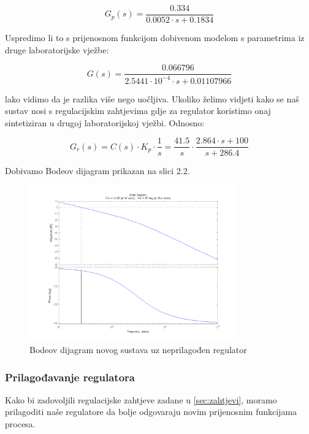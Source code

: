 \documentclass[12pt,a4paper]{article}
\begin{document}
\begin{equation}
G_p(s)=\frac{0.334}{0.0052\cdot s + 0.1834}
\end{equation}

\newpage

Uspredimo li to s prijenosnom funkcijom dobivenom modelom s parametrima iz druge laboratorijske vježbe:

\begin{equation}
G(s)=\frac{0.066796}{2.5441\cdot10^{-4}\cdot s + 0.01107966}
\end{equation}

lako vidimo da je razlika više nego uočljiva.
\newline
Ukoliko želimo vidjeti kako se naš sustav nosi s regulacijskim zahtjevima gdje za regulator koristimo onaj sintetiziran u drugoj laboratorijskoj vježbi. Odnosno:

\begin{equation}
G_r(s)=C(s)\cdot K_p \cdot \frac{1}{s} = \frac{41.5}{s} \cdot \frac{2.864\cdot s+100}{s+286.4}
\end{equation}

Dobivamo Bodeov dijagram prikazan na slici 2.2.

\begin{figure}[h]
	\begin{center}
	\includegraphics[width=0.8\textwidth]{bode_krivi_reg.png}
    \caption{Bodeov dijagram novog sustava uz neprilagođen regulator}
    \end{center}
\end{figure}

\subsubsection{Prilagođavanje regulatora}
Kako bi zadovoljili regulacijske zahtjeve zadane u \ref{sec:zahtjevi}, moramo prilagoditi naše regulatore da bolje odgovaraju novim prijenosnim funkcijama procesa.
\end{document}

